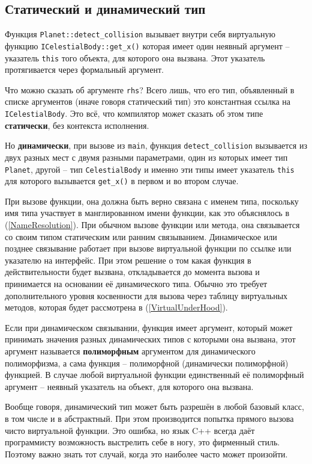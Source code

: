 \documentclass[a4paper,12pt,oneside]{book}
\begin{document}
\subsection{Статический и динамический тип}\label{StatDynPoly}

Функция \lstinline!Planet::detect_collision! вызывает внутри себя виртуальную функцию \lstinline!ICelestialBody::get_x()! которая имеет один неявный аргумент -- указатель \lstinline!this! того объекта, для которого она вызвана. Этот указатель протягивается через формальный аргумент. 

Что можно сказать об аргументе \lstinline!rhs!? Всего лишь, что его тип, объявленный в списке аргументов (иначе говоря статический тип) это константная ссылка на \lstinline!ICelestialBody!. Это всё, что компилятор может сказать об этом типе \textbf{статически}, без контекста исполнения.

Но \textbf{динамически}, при вызове из \lstinline!main!, функция \lstinline!detect_collision! вызывается из двух разных мест с двумя разными параметрами, один из которых имеет тип \lstinline!Planet!, другой – тип \lstinline!CelestialBody! и именно эти типы имеет указатель \lstinline!this! для которого вызывается \lstinline!get_x()! в первом и во втором случае.

При вызове функции, она должна быть верно связана с именем типа, поскольку имя типа участвует в манглированном имени функции, как это объяснялось в (\ref{NameResolution}). При обычном вызове функции или метода, она связывается со своим типом статическим или ранним связыванием. Динамическое или позднее связывание работает при вызове виртуальной функции по ссылке или указателю на интерфейс. При этом решение о том какая функция в действительности будет вызвана, откладывается до момента вызова и принимается на основании её динамического типа. Обычно это требует дополнительного уровня косвенности для вызова через таблицу виртуальных методов, которая будет рассмотрена в (\ref{VirtualUnderHood}).

Если при динамическом связывании, функция имеет аргумент, который может принимать значения разных динамических типов с которыми она вызвана, этот аргумент называется \textbf{полиморфным} аргументом для динамического полиморфизма, а сама функция -- полиморфной (динамически полиморфной) функцией. В случае любой виртуальной функции единственный её полиморфный аргумент -- неявный указатель на объект, для которого она вызвана.

Вообще говоря, динамический тип может быть разрешён в любой базовый класс, в том числе и в абстрактный. При этом производится попытка прямого вызова чисто виртуальной функции. Это ошибка, но язык C++ всегда даёт программисту возможность выстрелить себе в ногу, это фирменный стиль. Поэтому важно знать тот случай, когда это наиболее часто может произойти.
\end{document}
